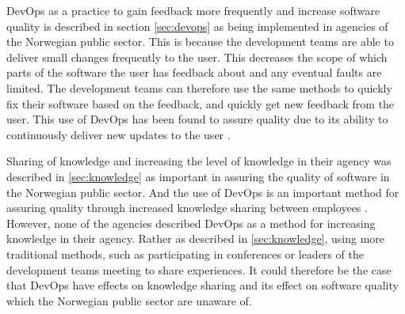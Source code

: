 
DevOps as a practice to gain feedback more frequently and increase software quality is described in section \autoref{sec:devops} as being implemented in agencies of the Norwegian public sector. This is because the development teams are able to deliver small changes frequently to the user. This decreases the scope of which parts of the software the user has feedback about and any eventual faults are limited. The development teams can therefore use the same methods to quickly fix their software based on the feedback, and quickly get new feedback from the user. This use of DevOps has been found to assure quality due to its ability to continuously deliver new updates to the user \cite{am_2020}\cite{smm_2018}\cite{ml_2022}.


Sharing of knowledge and increasing the level of knowledge in their agency was described in \autoref{sec:knowledge} as important in assuring the quality of software in the Norwegian public sector. And the use of DevOps is an important method for assuring quality through increased knowledge sharing between employees \cite{smm_2018}\cite{mm_2021}. However, none of the agencies described DevOps as a method for increasing knowledge in their agency. Rather as described in \autoref{sec:knowledge}, using more traditional methods, such as participating in conferences or leaders of the development teams meeting to share experiences. It could therefore be the case that DevOps have effects on knowledge sharing and its effect on software quality which the Norwegian public sector are unaware of.

